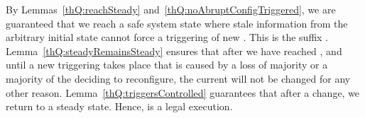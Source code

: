 \documentclass[11pt]{article}
\newcommand{\remove}[1]{}
\newtheorem{theorem}{Theorem}[section]
\newenvironment{proof}{\noindent{\bf Proof.}}{\hfill}
\begin{document}
\begin{proof}
By Lemmas~\ref{thQ:reachSteady} and~\ref{thQ:noAbruptConfigTriggered}, we are guaranteed that we reach a safe system state  where stale information from the arbitrary initial state cannot force a triggering of new .
This is the suffix .
Lemma~\ref{thQ:steadyRemainsSteady} ensures that after we have reached , and until a new triggering takes place that is caused by a loss of majority or a majority of the  deciding to reconfigure, the current  will not be changed for any other reason.
Lemma~\ref{thQ:triggersControlled} guarantees that after a change, we return to a steady  state.
Hence,  is a legal execution.
\end{proof}





















\remove{
A \emph{legal execution}  of Algorithm~\ref{alg:SSQR}, refers to an execution composed by steady  states and delicate configurations triggered due to loss of majority of configuration members, or due to the need of the majority of the members to reconfigure. 
The following lemmas give the outline of the proof, leading to the proof of Theorem~\ref{thm:corrupper}. The omitted details and proofs can be found in Appendix~\ref{app:upper}.\vspace{-.5em}



\begin{theorem}
\label{thm:corrupper}
Let  be an execution of Algorithm~\ref{alg:SSQR} starting from an arbitrary system state.  reaches a legal execution.\vspace{-1em}
\end{theorem}

}
\end{document}
